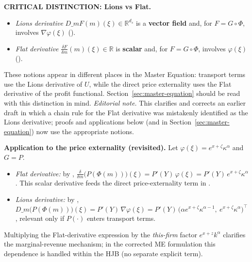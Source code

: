 \documentclass[11pt,letterpaper,oneside]{article}
\numberwithin{equation}{section}
\newcommand{\R}{\mathbb{R}}
\newcommand{\1}{\mathbf{1}}
\newcommand{\Dm}{D\_m}
\begin{document}
\begin{tcolorbox}[mathstyle]
\textbf{CRITICAL DISTINCTION: Lions vs Flat.}
\begin{itemize}[leftmargin=1.15em,itemsep=0.25em]
  \item \emph{Lions derivative} $\Dm F(m)(\xi)\in\R^{d_s}$ is a \textbf{vector field} and, for $F=G\circ\Phi$, involves $\nabla\varphi(\xi)$ ().
  \item \emph{Flat derivative} $\tfrac{\delta F}{\delta m}(m)(\xi)\in\R$ is \textbf{scalar} and, for $F=G\circ\Phi$, involves $\varphi(\xi)$ ().
\end{itemize}
These notions appear in different places in the Master Equation: transport terms use the Lions derivative of $U$, while the direct price externality uses the Flat derivative of the profit functional. Section~\ref{sec:master-equation} should be read with this distinction in mind.\newline
\emph{Editorial note.} This clarifies and corrects an earlier draft in which a chain rule for the Flat derivative was mistakenly identified as the Lions derivative; proofs and applications below (and in Section~\ref{sec:master-equation}) now use the appropriate notions.
\end{tcolorbox}

\begin{tcolorbox}[mathstyle]
\textbf{Application to the price externality (revisited).} Let $\varphi(\xi)=e^{x+\zeta}\kappa^\alpha$ and $G=P$.
\begin{itemize}[leftmargin=1.15em,itemsep=0.25em]
  \item \emph{Flat derivative:} by , $\tfrac{\delta}{\delta m}\big(P(\Phi(m))\big)(\xi)=P'(Y)\,\varphi(\xi)=P'(Y)\,e^{x+\zeta}\kappa^\alpha$. This scalar derivative feeds the direct price-externality term in .
  \item \emph{Lions derivative:} by , $\Dm\big(P(\Phi(m))\big)(\xi)=P'(Y)\,\nabla\varphi(\xi)=P'(Y)\,\big(\alpha e^{x+\zeta}\kappa^{\alpha-1},\ e^{x+\zeta}\kappa^\alpha\big)^{\!\top}$, relevant only if $P(\cdot)$ enters transport terms.
\end{itemize}
Multiplying the Flat-derivative expression by the \emph{this-firm} factor $e^{x+z}k^\alpha$ clarifies the marginal-revenue mechanism; in the corrected ME formulation this dependence is handled within the HJB (no separate explicit term).
\end{tcolorbox}
\end{document}
